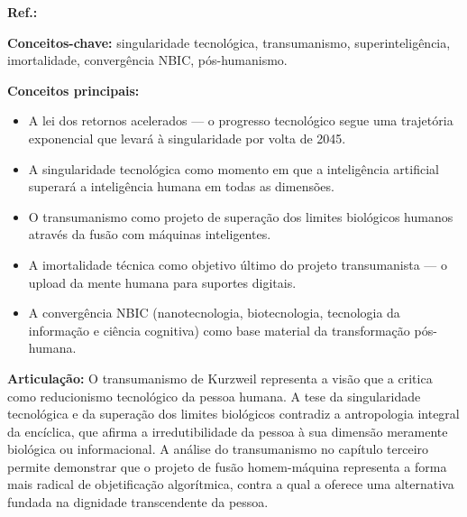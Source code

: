 \begin{fichamento}
    \textbf{Ref.:} \cite{Kurzweil2005THS}
    
    \textbf{Conceitos-chave:} singularidade tecnológica, transumanismo, superinteligência, imortalidade, convergência NBIC, pós-humanismo.
    
    \textbf{Conceitos principais:}
    \begin{itemize}
        \item A lei dos retornos acelerados — o progresso tecnológico segue uma trajetória exponencial que levará à singularidade por volta de 2045.
        \item A singularidade tecnológica como momento em que a inteligência artificial superará a inteligência humana em todas as dimensões.
        \item O transumanismo como projeto de superação dos limites biológicos humanos através da fusão com máquinas inteligentes.
        \item A imortalidade técnica como objetivo último do projeto transumanista — o upload da mente humana para suportes digitais.
        \item A convergência NBIC (nanotecnologia, biotecnologia, tecnologia da informação e ciência cognitiva) como base material da transformação pós-humana.
    \end{itemize}
    
    \textbf{Articulação:} O transumanismo de Kurzweil representa a visão que a \MH{} critica como reducionismo tecnológico da pessoa humana. A tese da singularidade tecnológica e da superação dos limites biológicos contradiz a antropologia integral da encíclica, que afirma a irredutibilidade da pessoa à sua dimensão meramente biológica ou informacional. A análise do transumanismo no capítulo terceiro permite demonstrar que o projeto de fusão homem-máquina representa a forma mais radical de objetificação algorítmica, contra a qual a \MH{} oferece uma alternativa fundada na dignidade transcendente da pessoa.
\end{fichamento}

